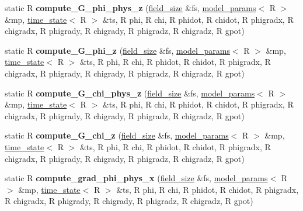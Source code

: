 \begin{DoxyCompactItemize}
\item 
\hypertarget{structgrid__funcs_a2148825eb7ea28f9f821474dec15de9e}{
static R {\bfseries compute\_\-G\_\-phi\_\-phys\_\-z} (\hyperlink{structfield__size}{field\_\-size} \&fs, \hyperlink{structmodel__params}{model\_\-params}$<$ R $>$ \&mp, \hyperlink{structtime__state}{time\_\-state}$<$ R $>$ \&ts, R phi, R chi, R phidot, R chidot, R phigradx, R chigradx, R phigrady, R chigrady, R phigradz, R chigradz, R gpot)}
\label{structgrid__funcs_a2148825eb7ea28f9f821474dec15de9e}

\item 
\hypertarget{structgrid__funcs_aece17c4bf3df82a8fd9c0b8fed335727}{
static R {\bfseries compute\_\-G\_\-phi\_\-z} (\hyperlink{structfield__size}{field\_\-size} \&fs, \hyperlink{structmodel__params}{model\_\-params}$<$ R $>$ \&mp, \hyperlink{structtime__state}{time\_\-state}$<$ R $>$ \&ts, R phi, R chi, R phidot, R chidot, R phigradx, R chigradx, R phigrady, R chigrady, R phigradz, R chigradz, R gpot)}
\label{structgrid__funcs_aece17c4bf3df82a8fd9c0b8fed335727}

\item 
\hypertarget{structgrid__funcs_a3b89a7a2ac1d6a998655bd5ce4dbc204}{
static R {\bfseries compute\_\-G\_\-chi\_\-phys\_\-z} (\hyperlink{structfield__size}{field\_\-size} \&fs, \hyperlink{structmodel__params}{model\_\-params}$<$ R $>$ \&mp, \hyperlink{structtime__state}{time\_\-state}$<$ R $>$ \&ts, R phi, R chi, R phidot, R chidot, R phigradx, R chigradx, R phigrady, R chigrady, R phigradz, R chigradz, R gpot)}
\label{structgrid__funcs_a3b89a7a2ac1d6a998655bd5ce4dbc204}

\item 
\hypertarget{structgrid__funcs_a533f151644c1899372b5815c232a3727}{
static R {\bfseries compute\_\-G\_\-chi\_\-z} (\hyperlink{structfield__size}{field\_\-size} \&fs, \hyperlink{structmodel__params}{model\_\-params}$<$ R $>$ \&mp, \hyperlink{structtime__state}{time\_\-state}$<$ R $>$ \&ts, R phi, R chi, R phidot, R chidot, R phigradx, R chigradx, R phigrady, R chigrady, R phigradz, R chigradz, R gpot)}
\label{structgrid__funcs_a533f151644c1899372b5815c232a3727}

\item 
\hypertarget{structgrid__funcs_a76be3f1e02e5e0ecf1d8a7e874580b68}{
static R {\bfseries compute\_\-grad\_\-phi\_\-phys\_\-x} (\hyperlink{structfield__size}{field\_\-size} \&fs, \hyperlink{structmodel__params}{model\_\-params}$<$ R $>$ \&mp, \hyperlink{structtime__state}{time\_\-state}$<$ R $>$ \&ts, R phi, R chi, R phidot, R chidot, R phigradx, R chigradx, R phigrady, R chigrady, R phigradz, R chigradz, R gpot)}
\label{structgrid__funcs_a76be3f1e02e5e0ecf1d8a7e874580b68}


\end{DoxyCompactItemize}
